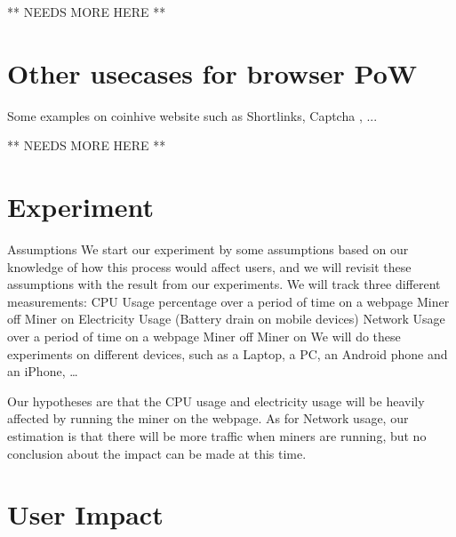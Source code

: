 ** NEEDS MORE HERE ** 

\section{Other usecases for browser PoW}
 
Some examples on coinhive website such as Shortlinks, Captcha , ... 

** NEEDS MORE HERE ** 


\section{Experiment}

Assumptions
	We start our experiment by some assumptions based on our knowledge of how this process would affect users, and we will revisit these assumptions with the result from our experiments.
We will track three different measurements:
CPU Usage percentage over a period of time on a webpage
Miner off
Miner on
Electricity Usage (Battery drain on mobile devices)
Network Usage over a period of time on a webpage
Miner off
Miner on
We will do these experiments on different devices, such as a Laptop, a PC, an Android phone and an iPhone, …

\begin{center}
\end{center}


Our hypotheses are that the CPU usage and electricity usage will be heavily affected by running the miner on the webpage. As for Network usage, our estimation is that there will be more traffic when miners are running, but no conclusion about the impact can be made at this time.


\section{User Impact}

